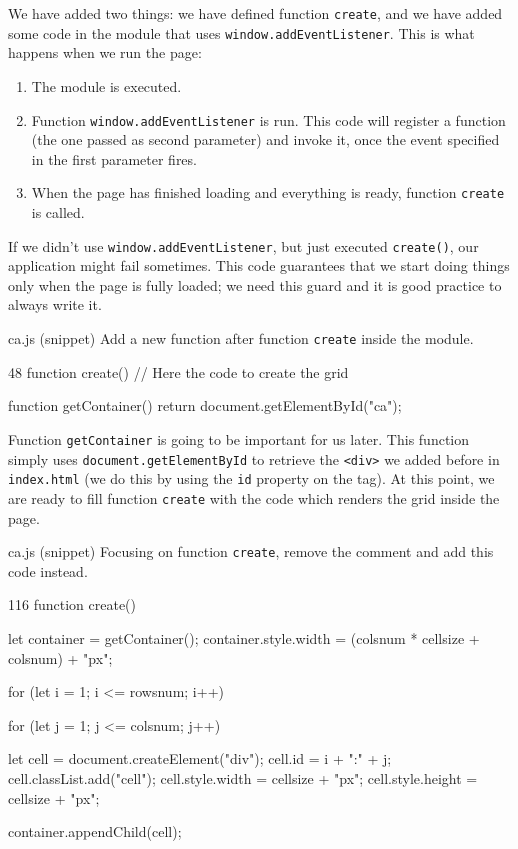We have added two things: we have defined function \texttt{create}, and we have added some code in
the module that uses \texttt{window.addEventListener}. This is what happens when we run the page:

\begin{enumerate}
\item The module is executed.
\item Function \texttt{window.addEventListener} is run. This code will register a function (the one
passed as second parameter) and invoke it, once the event specified in the first parameter fires.
\item When the page has finished loading and everything is ready, function \texttt{create} is called.
\end{enumerate}

If we didn't use \texttt{window.addEventListener}, but just executed \texttt{create()}, our
application might fail sometimes. This code guarantees that we start doing things only when
the page is fully loaded; we need this guard and it is good practice to always write it.

\begin{programcode}{ca.js (snippet)}
Add a new function after function \texttt{create} inside the module.
\begin{codeh1}{4}{8}
function create() {
  // Here the code to create the grid
}

function getContainer() {
  return document.getElementById("ca");
}
\end{codeh1}
\end{programcode}

Function \texttt{getContainer} is going to be important for us later. This function simply
uses \texttt{document.getElementById} to retrieve the \texttt{<div>} we added before in
\texttt{index.html} (we do this by using the \texttt{id} property on the tag).
At this point, we are ready to fill function
\texttt{create} with the code which renders the grid inside the page.

\begin{programcode}{ca.js (snippet)}
Focusing on function \texttt{create}, remove the comment and add this code instead.
\begin{codeh1}{1}{16}
function create() {
  let container = getContainer();
  container.style.width = (colsnum * cellsize + colsnum) + "px";

  for (let i = 1; i <= rowsnum; i++) {
    for (let j = 1; j <= colsnum; j++) {
      let cell = document.createElement("div");
      cell.id = i + ":" + j;
      cell.classList.add("cell");
      cell.style.width = cellsize + "px";
      cell.style.height = cellsize + "px";

      container.appendChild(cell);
    }
  }
}
\end{codeh1}
\end{programcode}

